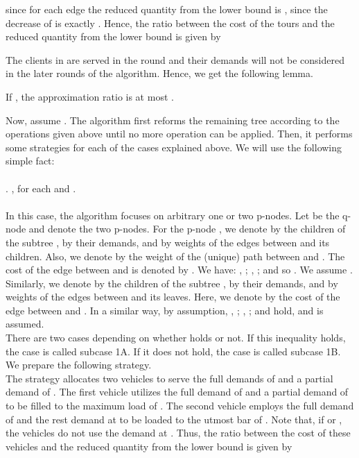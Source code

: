 \noindent since for each edge  the reduced quantity from the lower bound  is , since the decrease of  is exactly . Hence, the ratio between the cost of the tours and the reduced quantity from the lower bound is given by

\noindent The clients in  are served in the  round and their demands will not be considered in the later rounds of the algorithm. Hence, we get the following lemma.
 \begin{lemma}
If , the approximation ratio is at most .
\end{lemma}

 \indent Now, assume . The algorithm first reforms the remaining tree according to the operations given above until no more operation can be applied. Then, it performs some strategies for each of the cases explained above. We will use the following simple fact:\\
 \\
. , for each  and .\\
 \\
\indent  In this case, the algorithm focuses on arbitrary one or two p-nodes. Let  be the q-node and  denote the two p-nodes. For the p-node , we denote by  the children of the subtree , by  their demands, and by  weights of the edges between  and its children. Also, we denote by  the weight of the (unique) path between  and . The cost of the edge between  and  is denoted by . We have: , ; , ; and so . We assume . Similarly, we denote by  the children of the subtree , by  their demands, and by  weights of the edges between  and its leaves. Here, we denote by  the cost of the edge between  and . In a similar way, by assumption, , ; , ; and  hold, and  is assumed. \\

\indent There are two cases depending on whether  holds or not. If this inequality holds, the case is called subcase 1A. If it does not hold, the case is called subcase 1B.\\

\indent  We prepare the following strategy. \\
\indent  The strategy allocates two vehicles to serve the full demands of  and a partial demand of . The first vehicle utilizes the full demand of  and a partial demand of  to be filled to the maximum load of . The second vehicle employs the full demand of  and the rest demand at  to be loaded to the utmost bar of . Note that, if  or , the vehicles do not use the demand at . Thus, the ratio between the cost of these vehicles and the reduced quantity from the lower bound is given by

